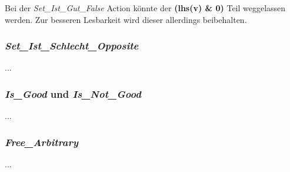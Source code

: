 Bei der \emph{Set\_Ist\_Gut\_False} Action könnte der \textbf{(lhs(v) \& 0)} Teil weggelassen werden. Zur besseren Lesbarkeit wird dieser allerdings beibehalten.




\subsubsection{\emph{Set\_Ist\_Schlecht\_Opposite}}
...


\subsubsection{\emph{Is\_Good} und \emph{Is\_Not\_Good}}
...


\subsubsection{\emph{Free\_Arbitrary}}
...
